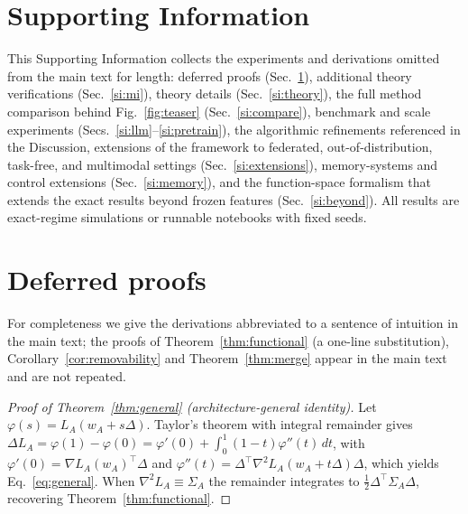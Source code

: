 \documentclass[10pt,a4paper]{article}
\theoremstyle{plain}
\theoremstyle{definition}
\newcommand{\Sig}{\Sigma}
\newcommand{\Del}{\Delta}
\begin{document}
\section*{\centering Supporting Information}
\medskip

\noindent This Supporting Information collects the experiments and derivations omitted from
the main text for length: deferred proofs (Sec.~\ref{si:proofs}), additional theory
verifications (Sec.~\ref{si:mi}), theory details
(Sec.~\ref{si:theory}), the full method comparison behind Fig.~\ref{fig:teaser}
(Sec.~\ref{si:compare}), benchmark and scale experiments
(Secs.~\ref{si:llm}--\ref{si:pretrain}), the algorithmic refinements referenced in the
Discussion, extensions of the framework to federated, out-of-distribution, task-free, and
multimodal settings (Sec.~\ref{si:extensions}), memory-systems and control extensions
(Sec.~\ref{si:memory}), and the function-space formalism that extends the exact results
beyond frozen features (Sec.~\ref{si:beyond}). All results are exact-regime simulations or
runnable notebooks with fixed seeds.

\section{Deferred proofs}
\label{si:proofs}
For completeness we give the derivations abbreviated to a sentence of intuition in the main
text; the proofs of Theorem~\ref{thm:functional} (a one-line substitution),
Corollary~\ref{cor:removability} and Theorem~\ref{thm:merge} appear in the main text and are
not repeated.

\begin{proof}[Proof of Theorem~\ref{thm:general} (architecture-general identity)]
Let $\varphi(s)=L_A(w_A+s\Del)$. Taylor's theorem with integral remainder gives
$\Del L_A=\varphi(1)-\varphi(0)=\varphi'(0)+\int_0^1(1-t)\varphi''(t)\,dt$, with
$\varphi'(0)=\nabla L_A(w_A)^\top\Del$ and
$\varphi''(t)=\Del^\top\nabla^2 L_A(w_A+t\Del)\Del$, which yields Eq.~\eqref{eq:general}. When
$\nabla^2 L_A\equiv\Sig_A$ the remainder integrates to $\tfrac12\Del^\top\Sig_A\Del$, recovering
Theorem~\ref{thm:functional}.
\end{proof}
\end{document}

